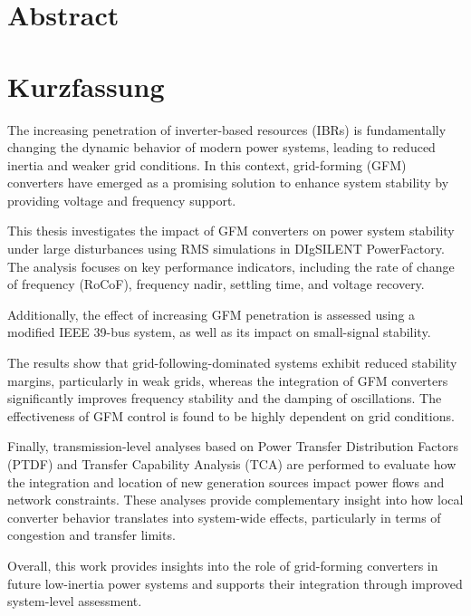 \ifdefined\ThesisLanguageIsEnglish
\chapter*{Abstract}
\else
\chapter*{Kurzfassung}
\fi
\label{ch:Abstract}


The increasing penetration of inverter-based resources (IBRs) is fundamentally changing the dynamic behavior of modern power systems, leading to reduced inertia and weaker grid conditions. In this context, grid-forming (GFM) converters have emerged as a promising solution to enhance system stability by providing voltage and frequency support.

This thesis investigates the impact of GFM converters on power system stability under large disturbances using RMS simulations in DIgSILENT PowerFactory. The analysis focuses on key performance indicators, including the rate of change of frequency (RoCoF), frequency nadir, settling time, and voltage recovery.

Additionally, the effect of increasing GFM penetration is assessed using a modified IEEE 39-bus system, as well as its impact on small-signal stability.

The results show that grid-following-dominated systems exhibit reduced stability margins, particularly in weak grids, whereas the integration of GFM converters significantly improves frequency stability and the damping of oscillations. The effectiveness of GFM control is found to be highly dependent on grid conditions. 

Finally, transmission-level analyses based on Power Transfer Distribution Factors (PTDF) and Transfer Capability Analysis (TCA) are performed to evaluate how the integration and location of new generation sources impact power flows and network constraints. These analyses provide complementary insight into how local converter behavior translates into system-wide effects, particularly in terms of congestion and transfer limits.

Overall, this work provides insights into the role of grid-forming converters in future low-inertia power systems and supports their integration through improved system-level assessment.

